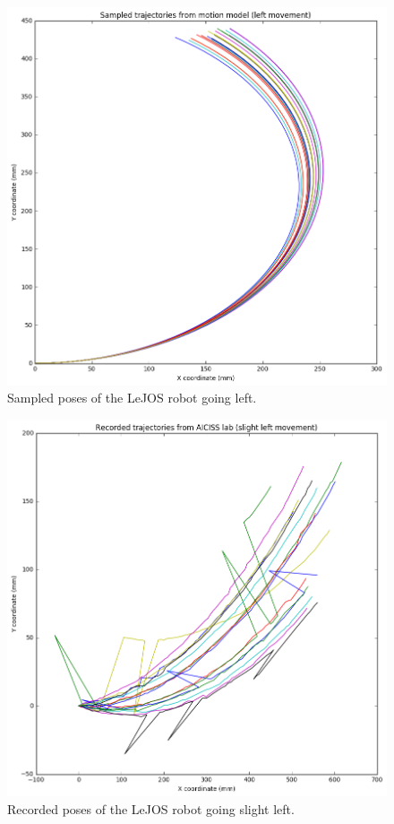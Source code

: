\documentclass[paper=a4, fontsize=11pt]{scrartcl} %
\begin{document}
    \begin{figure}[h!]
        \begin{center}
            \setlength{\fboxsep}{0.5pt} %
            \setlength{\fboxrule}{0.5pt}
            \includegraphics[width=12cm,fbox]{images/sampled_poses_left.png}
            \caption{Sampled poses of the LeJOS robot going left.}
        \end{center}
    \end{figure}

    \begin{figure}[h!]
        \begin{center}
            \setlength{\fboxsep}{0.5pt} %
            \setlength{\fboxrule}{0.5pt}
            \includegraphics[width=12cm,fbox]{images/recorded_poses_slight_left.png}
            \caption{Recorded poses of the LeJOS robot going slight left.}
        \end{center}
    \end{figure}
\end{document}
